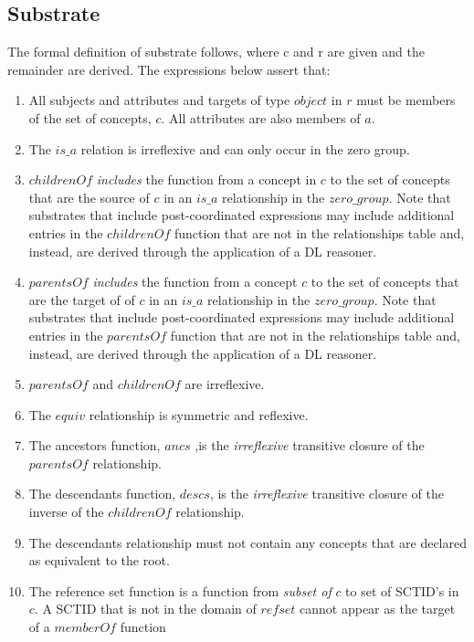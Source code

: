 \documentclass{article}
\begin{document}
\subsection{Substrate}
The formal definition of substrate follows, where c and r are given and the remainder are derived.  The expressions below assert that:
\begin{enumerate}
\item All subjects and attributes and targets of type $object$ in $r$  must be members of the set of concepts, $c$.  All attributes are also members of $a$.
\item The $is\_a$ relation is irreflexive and can only occur in the zero group.
\item $childrenOf$ \emph{includes} the function from a concept in $c$ to the set of concepts that are the source of $c$ in an $is\_a$ relationship in the $zero\_group$.  Note that 
substrates that include post-coordinated expressions may include additional entries in the $childrenOf$ function that are not in the relationships table and, instead, are derived 
through the application of a DL reasoner.
\item $parentsOf$ \emph{includes} the function from a concept $c$ to the set of concepts that are the target of of $c$ in an $is\_a$ relationship in the $zero\_group$.  Note that 
substrates that include post-coordinated expressions may include additional entries in the $parentsOf$ function that are not in the relationships table and, instead, are derived 
through the application of a DL reasoner.
\item $parentsOf$ and $childrenOf$ are irreflexive.
\item The $equiv$ relationship is symmetric and reflexive.
\item The ancestors function, $ancs$ ,is the \emph{irreflexive} transitive closure of the $parentsOf$ relationship.
\item The descendants function, $descs$, is the  \emph{irreflexive} transitive closure of the inverse of the $childrenOf$ relationship. 
\item The descendants relationship must not contain any concepts that are declared as equivalent to the root.
\item The reference set function is a function from  \emph{subset of} $c$ to set of SCTID's in $c$.  A SCTID that is not in the domain of $refset$ cannot appear as the target of a $memberOf$ function
\end{enumerate}
\end{document}
